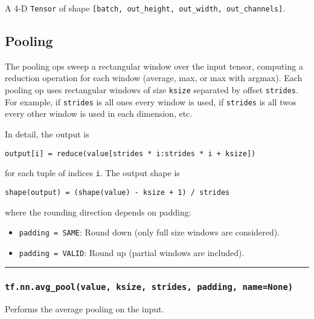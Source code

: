 A 4-D \texttt{Tensor} of shape
\texttt{{[}batch,\ out\_height,\ out\_width,\ out\_channels{]}}.

\subsection{Pooling }\label{pooling}

The pooling ops sweep a rectangular window over the input tensor,
computing a reduction operation for each window (average, max, or max
with argmax). Each pooling op uses rectangular windows of size
\texttt{ksize} separated by offset \texttt{strides}. For example, if
\texttt{strides} is all ones every window is used, if \texttt{strides}
is all twos every other window is used in each dimension, etc.

In detail, the output is

\begin{verbatim}
output[i] = reduce(value[strides * i:strides * i + ksize])
\end{verbatim}

for each tuple of indices \texttt{i}. The output shape is

\begin{verbatim}
shape(output) = (shape(value) - ksize + 1) / strides
\end{verbatim}

where the rounding direction depends on padding:

\begin{itemize}
\tightlist
\item
  \texttt{padding\ =\ \textquotesingle{}SAME\textquotesingle{}}: Round
  down (only full size windows are considered).
\item
  \texttt{padding\ =\ \textquotesingle{}VALID\textquotesingle{}}: Round
  up (partial windows are included).
\end{itemize}

\begin{center}\rule{0.5\linewidth}{\linethickness}\end{center}

\subsubsection{\texorpdfstring{\texttt{tf.nn.avg\_pool(value,\ ksize,\ strides,\ padding,\ name=None)}
}{tf.nn.avg\_pool(value, ksize, strides, padding, name=None) }}\label{tf.nn.avgux5fpoolvalue-ksize-strides-padding-namenone}

Performs the average pooling on the input.

